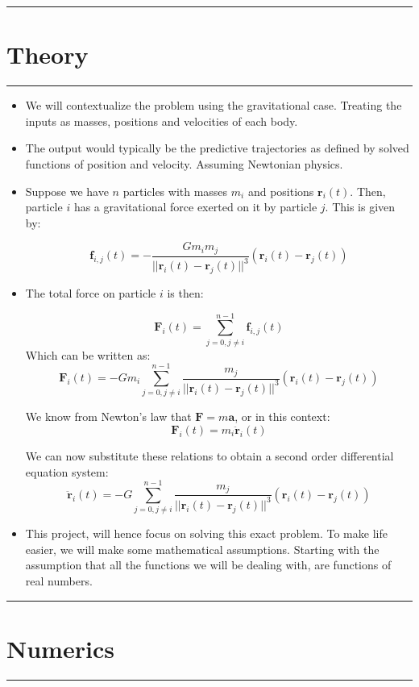 \documentclass[11pt]{article}
\newcommand{\psection}[1]{{
    \begin{center}
        \noindent \rule{17cm}{0.4pt}
        \section*{\LARGE #1}
        \noindent \rule{17cm}{0.4pt}
    \end{center}
}}
\begin{document}
    
    \newpage
    
    \psection{Theory}

    \begin{itemize}
        \item We will contextualize the problem using the gravitational case. Treating the inputs as masses, positions and velocities of each body. \\

        \item The output would typically be the predictive trajectories as defined by solved functions of position and velocity. Assuming Newtonian physics. \\

        \item Suppose we have $n$ particles with masses $m_i$ and positions $\mathbf{r}_i(t)$. Then, particle $i$ has a gravitational force exerted on it by particle $j$. This is given by:

        \[ \mathbf{f}_{i,j}(t) = -\frac{Gm_i m_j}{|| \mathbf{r}_i(t) - \mathbf{r}_j(t) ||^3}(\mathbf{r}_i(t) - \mathbf{r}_j(t)) \]

        \item The total force on particle $i$ is then:

        \[ \mathbf{F}_i(t) = \sum_{j=0, j\ne i}^{n-1} \mathbf{f}_{i,j}(t) \]
        \noindent
        Which can be written as:
        \[ \mathbf{F}_i(t) = -Gm_i \sum_{j=0, j\ne i}^{n-1} \frac{ m_j}{|| \mathbf{r}_i(t) - \mathbf{r}_j(t) ||^3}(\mathbf{r}_i(t) - \mathbf{r}_j(t)) \]

        We know from Newton's law that $\mathbf{F} = m\mathbf{a}$, or in this context:
        \[ \mathbf{F}_i(t) = m_i\mathbf{\ddot{r}}_i(t) \]

        We can now substitute these relations to obtain a second order differential equation system:
        \[ \mathbf{\ddot{r}}_i(t) = -G \sum_{j=0, j\ne i}^{n-1} \frac{ m_j}{|| \mathbf{r}_i(t) - \mathbf{r}_j(t) ||^3}(\mathbf{r}_i(t) - \mathbf{r}_j(t)) \]
        \item This project, will hence focus on solving this exact problem.
        To make life easier, we will make some mathematical assumptions. Starting with the assumption that all the functions we will be dealing with, are functions of real numbers.
    \end{itemize}
    
    \newpage
    
    \psection{Numerics}
    
\end{document}
